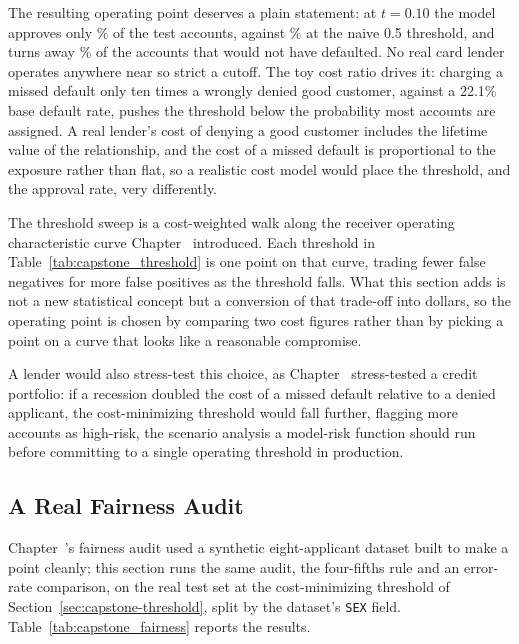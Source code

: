 \documentclass[../ai_in_finance]{subfiles}
\begin{document}
The resulting operating point deserves a plain statement: at $t = 0.10$ the model approves only \vChTwentyOneApproveBestPct\% of the test accounts, against \vChTwentyOneApproveNaivePct\% at the naive 0.5 threshold, and turns away \vChTwentyOneGoodDeniedPct\% of the accounts that would not have defaulted. No real card lender operates anywhere near so strict a cutoff. The toy cost ratio drives it: charging a missed default only ten times a wrongly denied good customer, against a 22.1\% base default rate, pushes the threshold below the probability most accounts are assigned. A real lender's cost of denying a good customer includes the lifetime value of the relationship, and the cost of a missed default is proportional to the exposure rather than flat, so a realistic cost model would place the threshold, and the approval rate, very differently.

The threshold sweep is a cost-weighted walk along the receiver operating characteristic curve Chapter~ introduced. Each threshold in Table~\ref{tab:capstone_threshold} is one point on that curve, trading fewer false negatives for more false positives as the threshold falls. What this section adds is not a new statistical concept but a conversion of that trade-off into dollars, so the operating point is chosen by comparing two cost figures rather than by picking a point on a curve that looks like a reasonable compromise.

A lender would also stress-test this choice, as Chapter~ stress-tested a credit portfolio: if a recession doubled the cost of a missed default relative to a denied applicant, the cost-minimizing threshold would fall further, flagging more accounts as high-risk, the scenario analysis a model-risk function should run before committing to a single operating threshold in production.

\subsection{A Real Fairness Audit}
\label{sec:capstone-fairness}

Chapter~'s fairness audit used a synthetic eight-applicant dataset built to make a point cleanly; this section runs the same audit, the four-fifths rule and an error-rate comparison, on the real test set at the cost-minimizing threshold of Section~\ref{sec:capstone-threshold}, split by the dataset's \texttt{SEX} field. Table~\ref{tab:capstone_fairness} reports the results.
\end{document}
